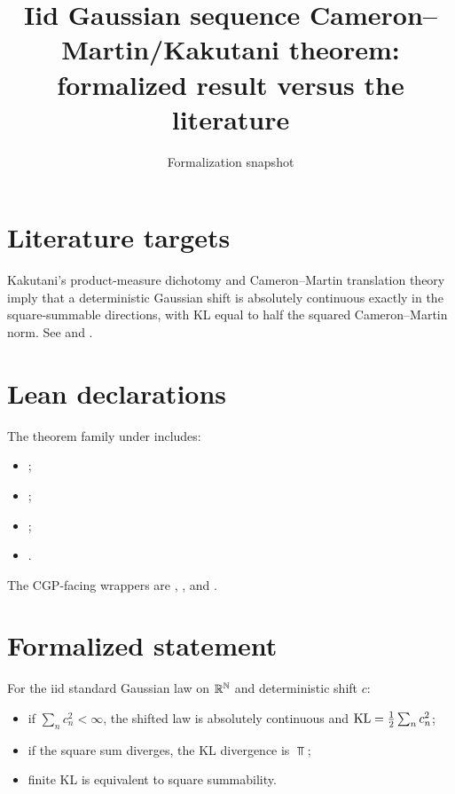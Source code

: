 \title{Iid Gaussian sequence Cameron--Martin/Kakutani theorem: formalized result versus the literature}
\author{}
\date{Formalization snapshot \snapshot}

\maketitle
{}
\section{Literature targets}
Kakutani's product-measure dichotomy and Cameron--Martin translation theory imply that a deterministic Gaussian shift is absolutely continuous exactly in the square-summable directions, with KL equal to half the squared Cameron--Martin norm.  See
 and
.

\section{Lean declarations}
The theorem family under  includes:
\begin{itemize}[leftmargin=2em]
\item {};
\item {};
\item {};
\item {}.
\end{itemize}
The CGP-facing wrappers are ,
, and
.

\section{Formalized statement}
For the iid standard Gaussian law on $\mathbb{R}^{\mathbb N}$ and deterministic shift $c$:
\begin{itemize}[leftmargin=2em]
\item if $\sum_n c_n^2<\infty$, the shifted law is absolutely continuous and
$\operatorname{KL}=\frac12\sum_n c_n^2$;
\item if the square sum diverges, the KL divergence is $\Top$;
\item finite KL is equivalent to square summability.
\end{itemize}


